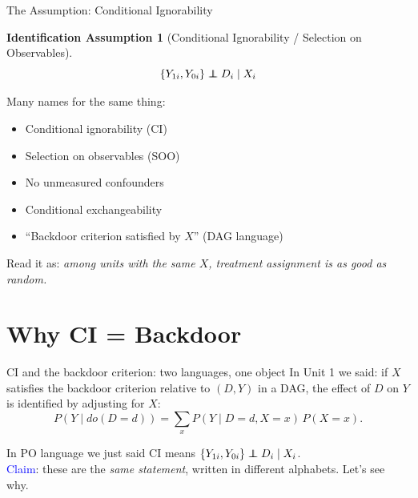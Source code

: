 \documentclass[xcolor=dvipsnames]{beamer}
\newcommand\indep{\protect\mathpalette{\protect\independenT}{\perp}}
\def\independenT#1#2{\mathrel{\rlap{$#1#2$}\mkern2mu{#1#2}}}
\newtheorem{iass}{Identification Assumption}
\begin{document}
\begin{frame}{The Assumption: Conditional Ignorability}
\small
{}
\begin{iass}[Conditional Ignorability / Selection on Observables]
$$\{Y_{1i}, Y_{0i}\} \indep D_i \mid X_i$$
\end{iass}

 Many names for the same thing:
\begin{itemize}
\footnotesize
\item Conditional ignorability (CI)
\item Selection on observables (SOO)
\item No unmeasured confounders
\item Conditional exchangeability
\item ``Backdoor criterion satisfied by $X$'' (DAG language)
\end{itemize}

\bigskip
{} Read it as: \textit{among units with the same $X$, treatment assignment is as good as random.}
\end{frame}


\section{Why CI = Backdoor}

\begin{frame}{CI and the backdoor criterion: two languages, one object}
\small
{} In Unit 1 we said: if $X$ satisfies the backdoor criterion relative to $(D,Y)$ in a DAG, the effect of $D$ on $Y$ is identified by adjusting for $X$:
$$P(Y \mid do(D\!=\!d)) = \sum_x P(Y \mid D\!=\!d, X\!=\!x)\,P(X\!=\!x).$$

 In PO language we just said CI means $\{Y_{1i}, Y_{0i}\} \indep D_i \mid X_i$.\\[4pt]

 \textcolor{Blue}{Claim}: these are the \textit{same statement}, written in different alphabets.  Let's see why.
\end{frame}
\end{document}
